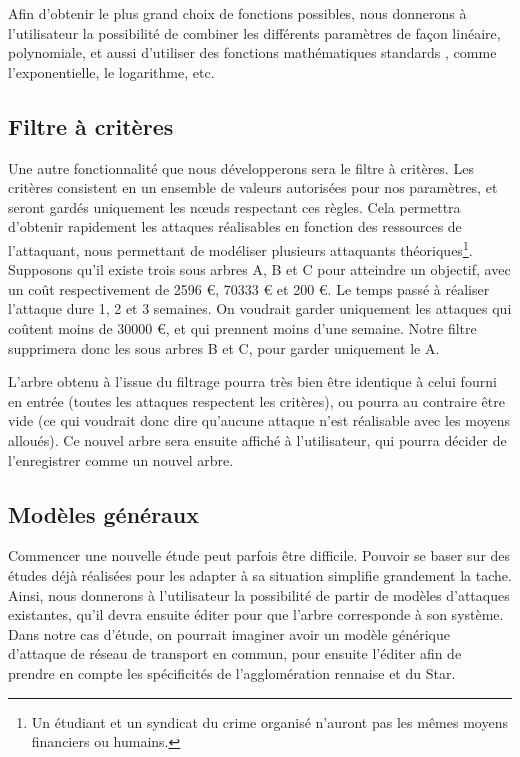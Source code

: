         Afin d'obtenir le plus grand choix de fonctions possibles, nous donnerons à l'utilisateur la possibilité de combiner les différents paramètres de façon linéaire, polynomiale, et aussi d'utiliser des fonctions mathématiques \og standards \fg, comme l'exponentielle, le logarithme, etc.

    \subsection{Filtre à critères}
        \label{sec:filtre}

        Une autre fonctionnalité que nous développerons sera le filtre à critères. Les critères consistent en un ensemble de valeurs autorisées pour nos paramètres, et seront gardés uniquement les nœuds respectant ces règles. Cela permettra d'obtenir rapidement les attaques réalisables en fonction des ressources de l'attaquant, nous permettant de modéliser plusieurs attaquants théoriques\footnote{Un étudiant et un syndicat du crime organisé n'auront pas les mêmes moyens financiers ou humains.}.
        Supposons qu'il existe trois sous arbres A, B et C pour atteindre un objectif, avec un coût respectivement de 2596 €, 70333 € et 200 €. Le temps passé à réaliser l'attaque dure 1, 2 et 3 semaines. On voudrait garder uniquement les attaques qui coûtent moins de 30000 €, et qui prennent moins d'une semaine. Notre filtre supprimera donc les sous arbres B et C, pour garder uniquement le A.

        L'arbre obtenu à l'issue du filtrage pourra très bien être identique à celui fourni en entrée (toutes les attaques respectent les critères), ou pourra au contraire être vide (ce qui voudrait donc dire qu'aucune attaque n'est réalisable avec les moyens alloués). Ce nouvel arbre sera ensuite affiché à l'utilisateur, qui pourra décider de l'enregistrer comme un nouvel arbre.

    \subsection{Modèles généraux}
        \label{sec:modele}

        Commencer une nouvelle étude peut parfois être difficile. Pouvoir se baser sur des études déjà réalisées pour les adapter à sa situation simplifie grandement la tache. Ainsi, nous donnerons à l'utilisateur la possibilité de partir de modèles d'attaques existantes, qu'il devra ensuite éditer pour que l'arbre corresponde à son système. Dans notre cas d'étude, on pourrait imaginer avoir un modèle générique d'attaque de réseau de transport en commun, pour ensuite l'éditer afin de prendre en compte les spécificités de l'agglomération rennaise et du Star.

